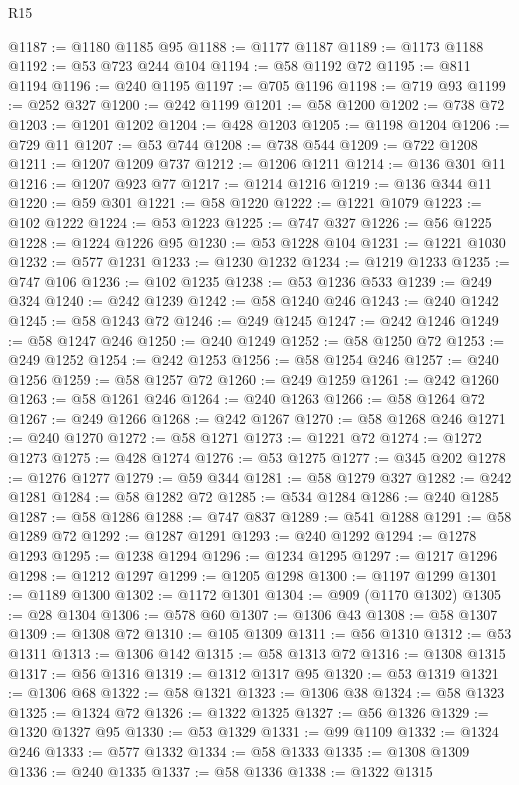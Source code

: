 \begin{lexlean}{R15}
\begin{coremodule}
@1187 := @1180 @1185 @95
@1188 := @1177 @1187
@1189 := @1173 @1188
@1192 := @53 @723 @244 @104
@1194 := @58 @1192 @72
@1195 := @811 @1194
@1196 := @240 @1195
@1197 := @705 @1196
@1198 := @719 @93
@1199 := @252 @327
@1200 := @242 @1199
@1201 := @58 @1200
@1202 := @738 @72
@1203 := @1201 @1202
@1204 := @428 @1203
@1205 := @1198 @1204
@1206 := @729 @11
@1207 := @53 @744
@1208 := @738 @544
@1209 := @722 @1208
@1211 := @1207 @1209 @737
@1212 := @1206 @1211
@1214 := @136 @301 @11
@1216 := @1207 @923 @77
@1217 := @1214 @1216
@1219 := @136 @344 @11
@1220 := @59 @301
@1221 := @58 @1220
@1222 := @1221 @1079
@1223 := @102 @1222
@1224 := @53 @1223
@1225 := @747 @327
@1226 := @56 @1225
@1228 := @1224 @1226 @95
@1230 := @53 @1228 @104
@1231 := @1221 @1030
@1232 := @577 @1231
@1233 := @1230 @1232
@1234 := @1219 @1233
@1235 := @747 @106
@1236 := @102 @1235
@1238 := @53 @1236 @533
@1239 := @249 @324
@1240 := @242 @1239
@1242 := @58 @1240 @246
@1243 := @240 @1242
@1245 := @58 @1243 @72
@1246 := @249 @1245
@1247 := @242 @1246
@1249 := @58 @1247 @246
@1250 := @240 @1249
@1252 := @58 @1250 @72
@1253 := @249 @1252
@1254 := @242 @1253
@1256 := @58 @1254 @246
@1257 := @240 @1256
@1259 := @58 @1257 @72
@1260 := @249 @1259
@1261 := @242 @1260
@1263 := @58 @1261 @246
@1264 := @240 @1263
@1266 := @58 @1264 @72
@1267 := @249 @1266
@1268 := @242 @1267
@1270 := @58 @1268 @246
@1271 := @240 @1270
@1272 := @58 @1271
@1273 := @1221 @72
@1274 := @1272 @1273
@1275 := @428 @1274
@1276 := @53 @1275
@1277 := @345 @202
@1278 := @1276 @1277
@1279 := @59 @344
@1281 := @58 @1279 @327
@1282 := @242 @1281
@1284 := @58 @1282 @72
@1285 := @534 @1284
@1286 := @240 @1285
@1287 := @58 @1286
@1288 := @747 @837
@1289 := @541 @1288
@1291 := @58 @1289 @72
@1292 := @1287 @1291
@1293 := @240 @1292
@1294 := @1278 @1293
@1295 := @1238 @1294
@1296 := @1234 @1295
@1297 := @1217 @1296
@1298 := @1212 @1297
@1299 := @1205 @1298
@1300 := @1197 @1299
@1301 := @1189 @1300
@1302 := @1172 @1301
@1304 := @909 (@1170 @1302)
@1305 := @28 @1304
@1306 := @578 @60
@1307 := @1306 @43
@1308 := @58 @1307
@1309 := @1308 @72
@1310 := @105 @1309
@1311 := @56 @1310
@1312 := @53 @1311
@1313 := @1306 @142
@1315 := @58 @1313 @72
@1316 := @1308 @1315
@1317 := @56 @1316
@1319 := @1312 @1317 @95
@1320 := @53 @1319
@1321 := @1306 @68
@1322 := @58 @1321
@1323 := @1306 @38
@1324 := @58 @1323
@1325 := @1324 @72
@1326 := @1322 @1325
@1327 := @56 @1326
@1329 := @1320 @1327 @95
@1330 := @53 @1329
@1331 := @99 @1109
@1332 := @1324 @246
@1333 := @577 @1332
@1334 := @58 @1333
@1335 := @1308 @1309
@1336 := @240 @1335
@1337 := @58 @1336
@1338 := @1322 @1315

\end{coremodule}
\end{lexlean}

